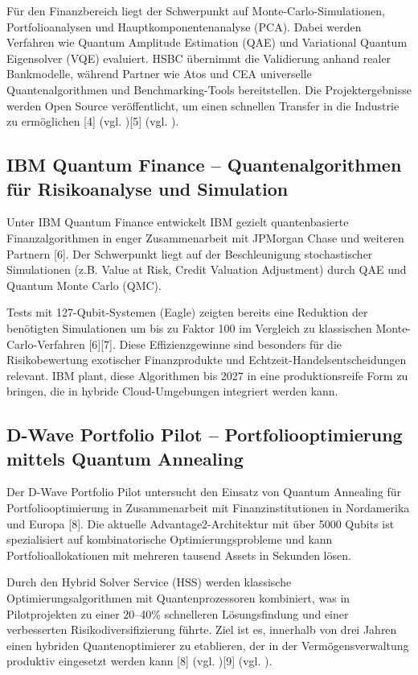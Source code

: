 Für den Finanzbereich liegt der Schwerpunkt auf Monte-Carlo-Simulationen, Portfolioanalysen und Hauptkomponentenanalyse (PCA). Dabei werden Verfahren wie Quantum Amplitude Estimation (QAE) und Variational Quantum Eigensolver (VQE) evaluiert. HSBC übernimmt die Validierung anhand realer Bankmodelle, während Partner wie Atos und CEA universelle Quantenalgorithmen und Benchmarking-Tools bereitstellen. Die Projektergebnisse werden Open Source veröffentlicht, um einen schnellen Transfer in die Industrie zu ermöglichen [4] (vgl. \cite{brandhofer_benchmarking_2022})[5] (vgl. \cite{brandhofer_benchmarking_2022}).

\subsection{IBM Quantum Finance – Quantenalgorithmen für Risikoanalyse und Simulation}

Unter IBM Quantum Finance entwickelt IBM gezielt quantenbasierte Finanzalgorithmen in enger Zusammenarbeit mit JPMorgan Chase und weiteren Partnern [6]. Der Schwerpunkt liegt auf der Beschleunigung stochastischer Simulationen (z.B. Value at Risk, Credit Valuation Adjustment) durch QAE und Quantum Monte Carlo (QMC).

Tests mit 127-Qubit-Systemen (Eagle) zeigten bereits eine Reduktion der benötigten Simulationen um bis zu Faktor 100 im Vergleich zu klassischen Monte-Carlo-Verfahren [6][7]. Diese Effizienzgewinne sind besonders für die Risikobewertung exotischer Finanzprodukte und Echtzeit-Handelsentscheidungen relevant. IBM plant, diese Algorithmen bis 2027 in eine produktionsreife Form zu bringen, die in hybride Cloud-Umgebungen integriert werden kann.

\subsection{D-Wave Portfolio Pilot – Portfoliooptimierung mittels Quantum Annealing}

Der D-Wave Portfolio Pilot untersucht den Einsatz von Quantum Annealing für Portfoliooptimierung in Zusammenarbeit mit Finanzinstitutionen in Nordamerika und Europa [8]. Die aktuelle Advantage2-Architektur mit über 5000 Qubits ist spezialisiert auf kombinatorische Optimierungsprobleme und kann Portfolioallokationen mit mehreren tausend Assets in Sekunden lösen.

Durch den Hybrid Solver Service (HSS) werden klassische Optimierungsalgorithmen mit Quantenprozessoren kombiniert, was in Pilotprojekten zu einer 20–40\% schnelleren Lösungsfindung und einer verbesserten Risikodiversifizierung führte. Ziel ist es, innerhalb von drei Jahren einen hybriden Quantenoptimierer zu etablieren, der in der Vermögensverwaltung produktiv eingesetzt werden kann [8] (vgl. \cite{brandhofer_benchmarking_2022})[9] (vgl. \cite{brandhofer_benchmarking_2022}).

